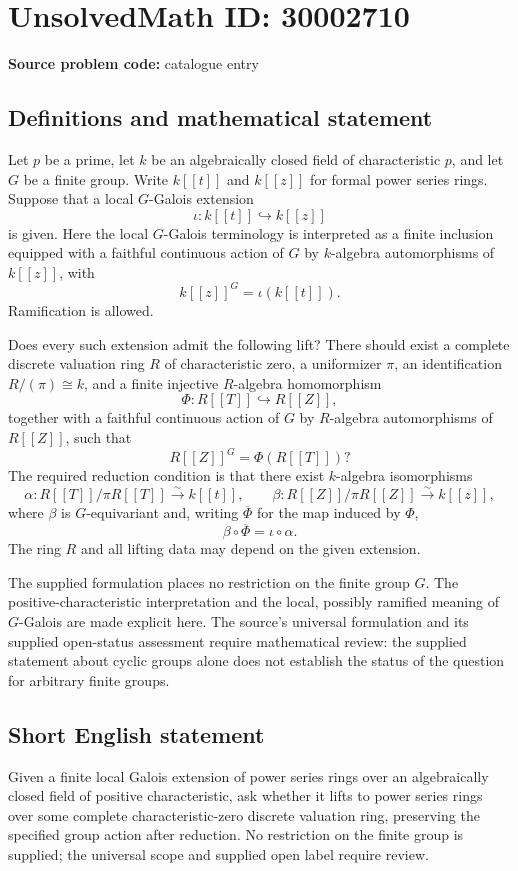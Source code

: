 \documentclass[11pt]{article}
\begin{document}
\section*{UnsolvedMath ID: 30002710}
\textbf{Source problem code:} catalogue entry
\subsection{Definitions and mathematical statement}
Let \(p\) be a prime, let \(k\) be an algebraically closed field of characteristic \(p\), and let \(G\) be a finite group. Write \(k[[t]]\) and \(k[[z]]\) for formal power series rings. Suppose that a local \(G\)-Galois extension
\[
\iota:k[[t]]\hookrightarrow k[[z]]
\]
is given. Here the local \(G\)-Galois terminology is interpreted as a finite inclusion equipped with a faithful continuous action of \(G\) by \(k\)-algebra automorphisms of \(k[[z]]\), with
\[
k[[z]]^G=\iota(k[[t]]).
\]
Ramification is allowed.

Does every such extension admit the following lift? There should exist a complete discrete valuation ring \(R\) of characteristic zero, a uniformizer \(\pi\), an identification \(R/(\pi)\cong k\), and a finite injective \(R\)-algebra homomorphism
\[
\Phi:R[[T]]\hookrightarrow R[[Z]],
\]
together with a faithful continuous action of \(G\) by \(R\)-algebra automorphisms of \(R[[Z]]\), such that
\[
R[[Z]]^G=\Phi(R[[T]])?
\]
The required reduction condition is that there exist \(k\)-algebra isomorphisms
\[
\alpha:R[[T]]/\pi R[[T]]\xrightarrow{\sim}k[[t]],
\qquad
\beta:R[[Z]]/\pi R[[Z]]\xrightarrow{\sim}k[[z]],
\]
where \(\beta\) is \(G\)-equivariant and, writing \(\overline{\Phi}\) for the map induced by \(\Phi\),
\[
\beta\circ\overline{\Phi}=\iota\circ\alpha.
\]
The ring \(R\) and all lifting data may depend on the given extension.

The supplied formulation places no restriction on the finite group \(G\). The positive-characteristic interpretation and the local, possibly ramified meaning of \(G\)-Galois are made explicit here. The source's universal formulation and its supplied open-status assessment require mathematical review: the supplied statement about cyclic groups alone does not establish the status of the question for arbitrary finite groups.
\subsection{Short English statement}
Given a finite local Galois extension of power series rings over an algebraically closed field of positive characteristic, ask whether it lifts to power series rings over some complete characteristic-zero discrete valuation ring, preserving the specified group action after reduction. No restriction on the finite group is supplied; the universal scope and supplied open label require review.
\end{document}
